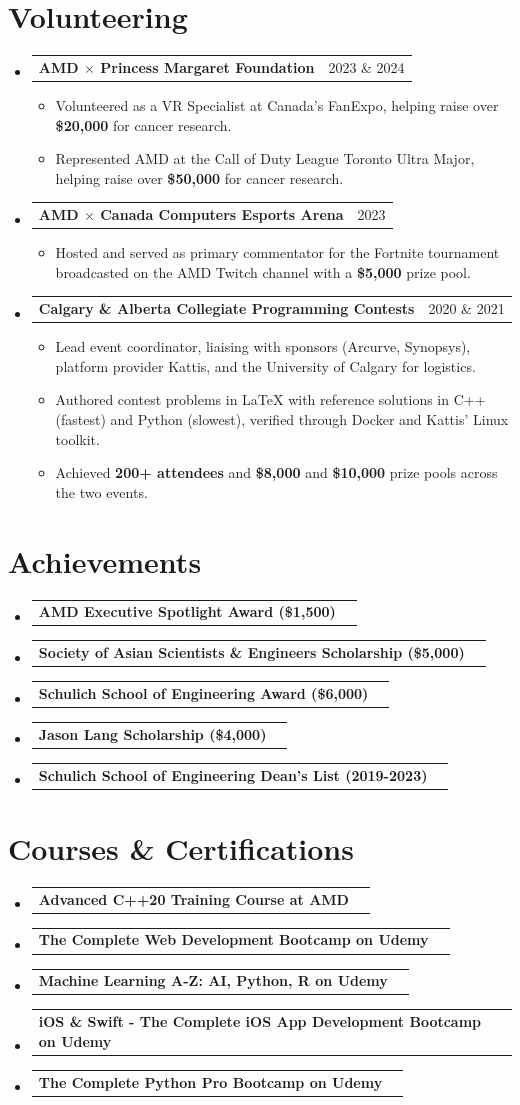 \documentclass[letterpaper,11pt]{article}
\makeatletter
\newcommand{\resumeItem}[1]{
  \item\small{
    {#1 \vspace{-2pt}}
  }
}
\newcommand{\resumeProjectHeading}[2]{
    \item
    \begin{tabular*}{0.97\textwidth}{l@{\extracolsep{\fill}}r}
      \small\textbf{#1} & #2 \\
    \end{tabular*}\vspace{-7pt}
}
\newcommand{\resumeSubHeadingListStart}{\begin{itemize}[leftmargin=0.15in, label={}]}
\newcommand{\resumeSubHeadingListEnd}{\end{itemize}}
\newcommand{\resumeItemListStart}{\begin{itemize}}
\newcommand{\resumeItemListEnd}{\end{itemize}\vspace{-5pt}}
\makeatother
\begin{document}
\section{Volunteering}
  \resumeSubHeadingListStart
  \resumeProjectHeading
    {AMD $\times$ Princess Margaret Foundation}{2023 \& 2024}
        \resumeItemListStart
        \resumeItem{Volunteered as a VR Specialist at Canada's FanExpo, helping raise over \textbf{\$20,000} for cancer research.}
        \resumeItem{Represented AMD at the Call of Duty League Toronto Ultra Major, helping raise over \textbf{\$50,000} for cancer research.}
        \resumeItemListEnd
  \resumeProjectHeading
    {AMD $\times$ Canada Computers Esports Arena}{2023}
        \resumeItemListStart
        \resumeItem{Hosted and served as primary commentator for the Fortnite tournament broadcasted on the AMD Twitch channel with a \textbf{\$5,000} prize pool.}
        \resumeItemListEnd
  \resumeProjectHeading
    {Calgary \& Alberta Collegiate Programming Contests}{2020 \& 2021}
        \resumeItemListStart
        \resumeItem{Lead event coordinator, liaising with sponsors (Arcurve, Synopsys), platform provider Kattis, and the University of Calgary for logistics.}
        \resumeItem{Authored contest problems in LaTeX with reference solutions in C++ (fastest) and Python (slowest), verified through Docker and Kattis' Linux toolkit.}
        \resumeItem{Achieved \textbf{200+ attendees} and \textbf{\$8,000} and \textbf{\$10,000} prize pools across the two events.}
        \resumeItemListEnd
    \resumeSubHeadingListEnd

\section{Achievements}
    \resumeSubHeadingListStart
      \resumeProjectHeading {AMD Executive Spotlight Award (\$1,500)}{}
      \resumeProjectHeading {Society of Asian Scientists \& Engineers Scholarship (\$5,000)}{}
      \resumeProjectHeading {Schulich School of Engineering Award (\$6,000)}{}
      \resumeProjectHeading {Jason Lang Scholarship (\$4,000)}{}
      \resumeProjectHeading {Schulich School of Engineering Dean's List (2019-2023)}{}
    \resumeSubHeadingListEnd

\section{Courses \& Certifications}
    \resumeSubHeadingListStart
      \resumeProjectHeading {Advanced C++20 Training Course at AMD}{}
      \resumeProjectHeading {The Complete Web Development Bootcamp on Udemy}{}
      \resumeProjectHeading {Machine Learning A-Z: AI, Python, R on Udemy}{}
      \resumeProjectHeading {iOS \& Swift - The Complete iOS App Development Bootcamp on Udemy}{}
      \resumeProjectHeading {The Complete Python Pro Bootcamp on Udemy}{}
    \resumeSubHeadingListEnd

\end{document}
